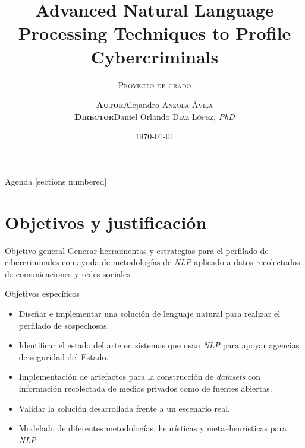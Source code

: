 \documentclass[10pt]{beamer}
\title{Advanced Natural Language Processing Techniques to Profile Cybercriminals}
\subtitle{\textsc{Proyecto de grado}}
\date{\today}
\institute{Escuela Colombiana de Ingenier\'{\i}a Julio Garavito}
\begin{document}
\author{%
  \begin{tabular}{rl}
    \textsc{\scriptsize \textbf{Autor}}    & Alejandro \textsc{Anzola \'Avila} \\
    \textsc{\scriptsize \textbf{Director}} & Daniel Orlando \textsc{D\'{\i}az L\'opez}, \textit{PhD} \\
  \end{tabular}
  \vspace{1em}
}


\maketitle

\begin{frame}{Agenda}
  [sections numbered]
  \tableofcontents
\end{frame}

\section{Objetivos y justificación}

\begin{frame}{Objetivo general}
  Generar herramientas y estrategias para el perfilado de cibercriminales con ayuda de metodologías de \emph{NLP} aplicado a datos recolectados de comunicaciones y redes sociales.
\end{frame}

\begin{frame}{Objetivos específicos}
  \begin{itemize}
  \item Diseñar e implementar una solución de lenguaje natural para realizar el perfilado de sospechosos.

  \item Identificar el estado del arte en sistemas que usan \emph{NLP} para apoyar agencias de seguridad del Estado.
    
  \item Implementación de artefactos para la construcción de \emph{datasets} con información recolectada de medios privados como de fuentes abiertas.
    
  \item Validar la solución desarrollada frente a un escenario real.

  \item Modelado de diferentes metodologías, heurísticas y meta--heurísticas para \emph{NLP}.
  \end{itemize}
  
\end{frame}
\end{document}
